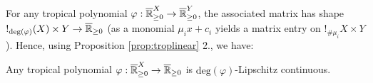 %


For any tropical polynomial $\varphi:\overline{\mathbb{R}}_{\geq 0}^{X}\to \overline{\mathbb{R}}_{\geq 0}^{Y}$, the associated matrix has shape $!_{\mathrm{deg}(\varphi)}(X)\times Y\to \overline{\mathbb{R}}_{\geq 0}$ (as a monomial $\mu_ix+c_{i}$ yields a matrix entry on $!_{\#\mu_i}X\times Y$). Hence, using Proposition \ref{prop:troplinear} 2., we have:
\begin{corollary}\label{prop:polylip}
Any tropical polynomial $\varphi:\overline{\mathbb{R}}_{\geq 0}^{X}\to\overline{\mathbb{R}}_{\geq 0}$ is $\mathrm{deg}(\varphi)$-Lipschitz continuous.
\end{corollary}

